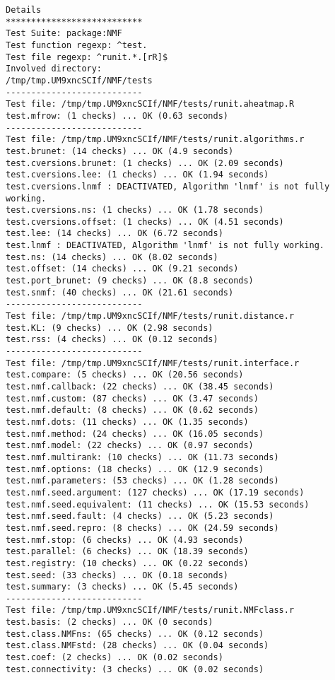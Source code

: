 \documentclass[10pt]{article}
\begin{document}
\begin{verbatim}
Details 
*************************** 
Test Suite: package:NMF 
Test function regexp: ^test. 
Test file regexp: ^runit.*.[rR]$ 
Involved directory: 
/tmp/tmp.UM9xncSCIf/NMF/tests 
--------------------------- 
Test file: /tmp/tmp.UM9xncSCIf/NMF/tests/runit.aheatmap.R 
test.mfrow: (1 checks) ... OK (0.63 seconds)
--------------------------- 
Test file: /tmp/tmp.UM9xncSCIf/NMF/tests/runit.algorithms.r 
test.brunet: (14 checks) ... OK (4.9 seconds)
test.cversions.brunet: (1 checks) ... OK (2.09 seconds)
test.cversions.lee: (1 checks) ... OK (1.94 seconds)
test.cversions.lnmf : DEACTIVATED, Algorithm 'lnmf' is not fully working.
test.cversions.ns: (1 checks) ... OK (1.78 seconds)
test.cversions.offset: (1 checks) ... OK (4.51 seconds)
test.lee: (14 checks) ... OK (6.72 seconds)
test.lnmf : DEACTIVATED, Algorithm 'lnmf' is not fully working.
test.ns: (14 checks) ... OK (8.02 seconds)
test.offset: (14 checks) ... OK (9.21 seconds)
test.port_brunet: (9 checks) ... OK (8.8 seconds)
test.snmf: (40 checks) ... OK (21.61 seconds)
--------------------------- 
Test file: /tmp/tmp.UM9xncSCIf/NMF/tests/runit.distance.r 
test.KL: (9 checks) ... OK (2.98 seconds)
test.rss: (4 checks) ... OK (0.12 seconds)
--------------------------- 
Test file: /tmp/tmp.UM9xncSCIf/NMF/tests/runit.interface.r 
test.compare: (5 checks) ... OK (20.56 seconds)
test.nmf.callback: (22 checks) ... OK (38.45 seconds)
test.nmf.custom: (87 checks) ... OK (3.47 seconds)
test.nmf.default: (8 checks) ... OK (0.62 seconds)
test.nmf.dots: (11 checks) ... OK (1.35 seconds)
test.nmf.method: (24 checks) ... OK (16.05 seconds)
test.nmf.model: (22 checks) ... OK (0.97 seconds)
test.nmf.multirank: (10 checks) ... OK (11.73 seconds)
test.nmf.options: (18 checks) ... OK (12.9 seconds)
test.nmf.parameters: (53 checks) ... OK (1.28 seconds)
test.nmf.seed.argument: (127 checks) ... OK (17.19 seconds)
test.nmf.seed.equivalent: (11 checks) ... OK (15.53 seconds)
test.nmf.seed.fault: (4 checks) ... OK (5.23 seconds)
test.nmf.seed.repro: (8 checks) ... OK (24.59 seconds)
test.nmf.stop: (6 checks) ... OK (4.93 seconds)
test.parallel: (6 checks) ... OK (18.39 seconds)
test.registry: (10 checks) ... OK (0.22 seconds)
test.seed: (33 checks) ... OK (0.18 seconds)
test.summary: (3 checks) ... OK (5.45 seconds)
--------------------------- 
Test file: /tmp/tmp.UM9xncSCIf/NMF/tests/runit.NMFclass.r 
test.basis: (2 checks) ... OK (0 seconds)
test.class.NMFns: (65 checks) ... OK (0.12 seconds)
test.class.NMFstd: (28 checks) ... OK (0.04 seconds)
test.coef: (2 checks) ... OK (0.02 seconds)
test.connectivity: (3 checks) ... OK (0.02 seconds)

\end{verbatim}
\end{document}
